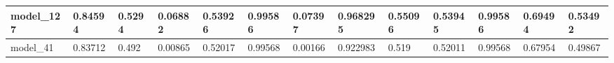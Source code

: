 \begin{tabular}{|l|l|l|l|l|l|l|l|l|l|l|l|l|}
model\_127     & 0.84594     & 0.5294         & 0.06882      & 0.53926          & 0.99586              & 0.07397              & 0.968295     & 0.55096           & 0.53945            & 0.99586         & 0.69494     & 0.53492      \\ \hline
model\_41      & 0.83712     & 0.492          & 0.00865      & 0.52017          & 0.99568              & 0.00166              & 0.922983     & 0.519             & 0.52011            & 0.99568         & 0.67954     & 0.49867      \\ \hline
\end{tabular}